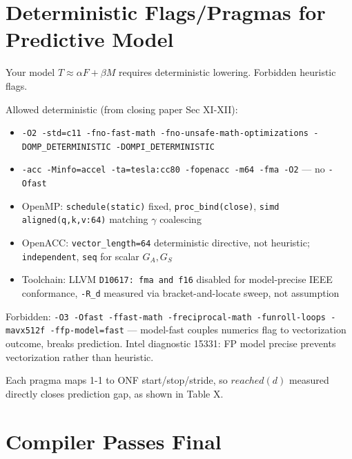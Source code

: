 \documentclass[11pt,a4paper]{article}
\begin{document}
\section{Deterministic Flags/Pragmas for Predictive Model}

Your model $T\approx\alpha F+\beta M$ requires deterministic lowering. Forbidden heuristic flags.

Allowed deterministic (from closing paper Sec XI-XII):
\begin{itemize}
\item \texttt{-O2 -std=c11 -fno-fast-math -fno-unsafe-math-optimizations -DOMP\_DETERMINISTIC -DOMPI\_DETERMINISTIC}
\item \texttt{-acc -Minfo=accel -ta=tesla:cc80 -fopenacc -m64 -fma -O2} — no \texttt{-Ofast}
\item OpenMP: \texttt{schedule(static)} fixed, \texttt{proc\_bind(close)}, \texttt{simd aligned(q,k,v:64)} matching $\gamma$ coalescing
\item OpenACC: \texttt{vector\_length=64} deterministic directive, not heuristic; \texttt{independent}, \texttt{seq} for scalar $G_A,G_S$
\item Toolchain: LLVM \texttt{D10617: fma and f16} disabled for model-precise IEEE conformance, \texttt{-R\_d} measured via bracket-and-locate sweep, not assumption
\end{itemize}

Forbidden: \texttt{-O3 -Ofast -ffast-math -freciprocal-math -funroll-loops -mavx512f -ffp-model=fast} — model-fast couples numerics flag to vectorization outcome, breaks prediction. Intel diagnostic 15331: FP model precise prevents vectorization rather than heuristic.

Each pragma maps 1-1 to ONF start/stop/stride, so $reached(d)$ measured directly closes prediction gap, as shown in Table X.

\section{Compiler Passes Final}
\end{document}
